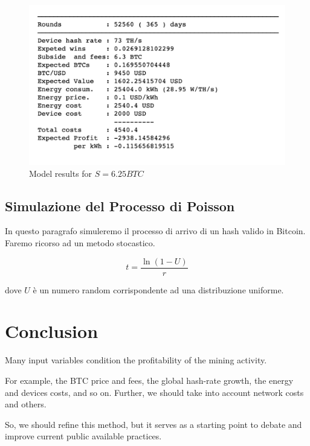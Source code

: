 \documentclass{article}
\begin{document}
\begin{figure}[h]
    \centering
    \includegraphics[scale=0.50]{img/results.png}
    \caption{Model results for $S = 6.25 BTC$}
    \label{fig:results}
\end{figure}

\clearpage

\subsection{Simulazione del Processo di Poisson}

In questo paragrafo simuleremo il processo di arrivo di un hash valido in Bitcoin.
Faremo ricorso ad un metodo stocastico.

\begin{equation}
    t = \frac{\ln(1 - U)}{r} \label{generateRandomPoissonProcessNumbers}
\end{equation}

dove $U$ è un numero random corrispondente ad una distribuzione uniforme.

\section{Conclusion}

Many input variables condition the profitability of the mining activity.

For example, the BTC price and fees, the global hash-rate growth, the energy and devices costs, and so on. Further, we should take into account network costs and others.

So, we should refine this method, but it serves as a starting point to debate and improve current public available practices.
\end{document}
